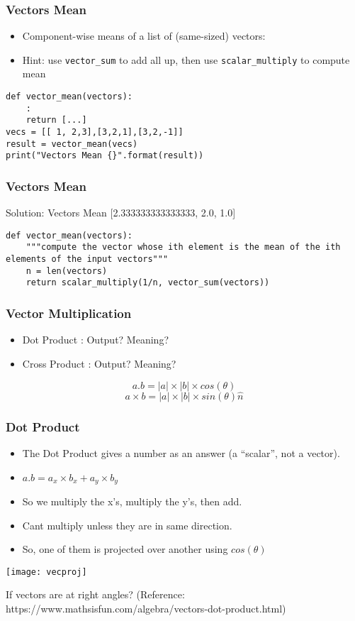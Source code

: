 \begin{frame}[fragile]\frametitle{Vectors Mean}
\begin{itemize}
\item Component-wise means of a list of (same-sized) vectors:
\item Hint: use \lstinline|vector_sum| to add all up, then use \lstinline|scalar_multiply| to compute mean
\end{itemize}
\begin{lstlisting}
def vector_mean(vectors):
	:
	return [...]
vecs = [[ 1, 2,3],[3,2,1],[3,2,-1]]
result = vector_mean(vecs)
print("Vectors Mean {}".format(result))
\end{lstlisting}
\end{frame}

\begin{frame}[fragile]\frametitle{Vectors Mean}
Solution: Vectors Mean [2.333333333333333, 2.0, 1.0]

\begin{lstlisting}
def vector_mean(vectors):
    """compute the vector whose ith element is the mean of the ith elements of the input vectors"""
    n = len(vectors)
    return scalar_multiply(1/n, vector_sum(vectors))
\end{lstlisting}
\end{frame}

\begin{frame}[fragile]\frametitle{Vector Multiplication}
\begin{itemize}
\item  Dot Product : Output? Meaning?
\item  Cross Product : Output? Meaning?
\end{itemize}
$$a.b = |a| \times |b| \times cos(\theta)$$
$$a \times b = |a| \times |b| \times sin(\theta)\hat{n}$$
\end{frame}


\begin{frame}[fragile]\frametitle{Dot Product}
\begin{itemize}
\item The Dot Product gives a number as an answer (a ``scalar'', not a vector). 
\item $a.b = a_x \times b_x + a_y \times b_y$
\item So we multiply the x's, multiply the y's, then add.
\item Cant multiply unless they are in same direction.
\item So, one of them is projected over another using $cos(\theta)$
\end{itemize}
\begin{center}
\texttt{[image: vecproj]}
\end{center}
If vectors are at right angles?
\tiny{(Reference: https://www.mathsisfun.com/algebra/vectors-dot-product.html)}
\end{frame}


